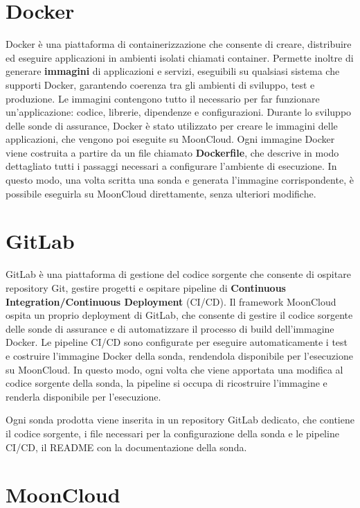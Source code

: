 \section{Docker}
\label{sec:docker}

Docker è una piattaforma di containerizzazione che consente di creare, distribuire ed eseguire applicazioni in ambienti isolati chiamati container. Permette inoltre di generare \textbf{immagini} di applicazioni e servizi, eseguibili su qualsiasi sistema che supporti Docker, garantendo coerenza tra gli ambienti di sviluppo, test e produzione. Le immagini contengono tutto il necessario per far funzionare un'applicazione: codice, librerie, dipendenze e configurazioni. Durante lo sviluppo delle sonde di assurance, Docker è stato utilizzato per creare le immagini delle applicazioni, che vengono poi eseguite su MoonCloud. Ogni immagine Docker viene costruita a partire da un file chiamato \textbf{Dockerfile}, che descrive in modo dettagliato tutti i passaggi necessari a configurare l'ambiente di esecuzione. In questo modo, una volta scritta una sonda e generata l'immagine corrispondente, è possibile eseguirla su MoonCloud direttamente, senza ulteriori modifiche.

\section{GitLab}
\label{sec:gitlab}

GitLab è una piattaforma di gestione del codice sorgente che consente di ospitare repository Git, gestire progetti e ospitare pipeline di \textbf{Continuous Integration/Continuous Deployment} (CI/CD). Il framework MoonCloud ospita un proprio deployment di GitLab, che consente di gestire il codice sorgente delle sonde di assurance e di automatizzare il processo di build dell'immagine Docker. Le pipeline CI/CD sono configurate per eseguire automaticamente i test e costruire l'immagine Docker della sonda, rendendola disponibile per l'esecuzione su MoonCloud. In questo modo, ogni volta che viene apportata una modifica al codice sorgente della sonda, la pipeline si occupa di ricostruire l'immagine e renderla disponibile per l'esecuzione.

Ogni sonda prodotta viene inserita in un repository GitLab dedicato, che contiene il codice sorgente, i file necessari per la configurazione della sonda e le pipeline CI/CD, il README con la documentazione della sonda. 

\section{MoonCloud}
\label{sec:mooncloud}

